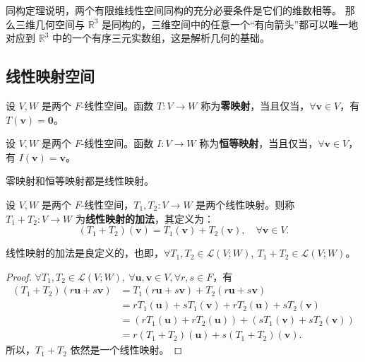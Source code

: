 \begin{note}
    同构定理说明，两个有限维线性空间同构的充分必要条件是它们的维数相等。
    那么三维几何空间与 $\mathbb{R}^3$ 是同构的，三维空间中的任意一个“有向箭头”都可以唯一地对应到 $\mathbb{R}^3$ 中的一个有序三元实数组，这是解析几何的基础。
\end{note}
\vspace{1em}

\subsection{线性映射空间}

\begin{definition}
    设 $V,W$ 是两个 $F$-线性空间。函数 $T:V\to W$ 称为\textbf{零映射}，当且仅当，$\forall \mathbf{v}\in V $，有 $ T(\mathbf{v}) = \mathbf{0} $。
    \label{def:zero_map}
\end{definition}

\begin{definition}
    设 $V,W$ 是两个 $F$-线性空间。函数 $I:V\to W$ 称为\textbf{恒等映射}，当且仅当，$\forall \mathbf{v}\in V $，有 $ I(\mathbf{v}) = \mathbf{v} $。
    \label{def:identity_map}
\end{definition}

\begin{proposition}
    零映射和恒等映射都是线性映射。
\end{proposition}

\begin{definition}[线性映射的加法]
    设 $V,W$ 是两个 $F$-线性空间，$T_1,T_2:V\to W$ 是两个线性映射。则称 $T_1+T_2:V\to W$ 为\textbf{线性映射的加法}，其定义为：
    \[
        (T_1+T_2)(\mathbf{v}) = T_1(\mathbf{v}) + T_2(\mathbf{v}), \quad \forall \mathbf{v}\in V.
    \]
\end{definition}

\begin{proposition}
    线性映射的加法是良定义的，也即，$\forall T_1,T_2\in \mathcal{L}(V;W),\ T_1+T_2\in \mathcal{L}(V;W)$。
\end{proposition}
\begin{proof}
    $\forall T_1,T_2\in \mathcal{L}(V;W),\ \forall \mathbf{u},\mathbf{v}\in V, \forall r,s \in F$，有
    \begin{align*}
        (T_1+T_2)(r\mathbf{u}+s\mathbf{v}) &= T_1(r\mathbf{u}+s\mathbf{v}) + T_2(r\mathbf{u}+s\mathbf{v}) \\
        &= rT_1(\mathbf{u}) + sT_1(\mathbf{v}) + rT_2(\mathbf{u}) + sT_2(\mathbf{v}) \\
        &= (rT_1(\mathbf{u}) + rT_2(\mathbf{u})) + (sT_1(\mathbf{v}) + sT_2(\mathbf{v})) \\
        &= r(T_1+T_2)(\mathbf{u}) + s(T_1+T_2)(\mathbf{v}).
    \end{align*}
    所以，$T_1+T_2$ 依然是一个线性映射。
\end{proof}

